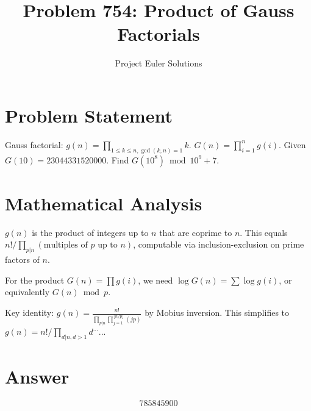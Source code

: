 \documentclass[11pt]{article}
\title{Problem 754: Product of Gauss Factorials}
\author{Project Euler Solutions}
\date{}
\begin{document}
\maketitle


\section{Problem Statement}
Gauss factorial: $g(n) = \prod_{{1\le k\le n, \gcd(k,n)=1}} k$. $G(n) = \prod_{{i=1}}^n g(i)$. Given $G(10)=23044331520000$. Find $G(10^8) \bmod 10^9+7$.

\section{Mathematical Analysis}
$g(n)$ is the product of integers up to $n$ that are coprime to $n$. This equals $n!/\prod_{{p|n}} (\text{multiples of } p \text{ up to } n)$, computable via inclusion-exclusion on prime factors of $n$.

For the product $G(n) = \prod g(i)$, we need $\log G(n) = \sum \log g(i)$, or equivalently $G(n) \bmod p$.

Key identity: $g(n) = \frac{n!}{\prod_{{p|n}} \prod_{{j=1}}^{{\lfloor n/p\rfloor}} (jp)}$ by Mobius inversion. This simplifies to $g(n) = n! / \prod_{{d|n, d>1}} d^{...}$...

\section{Answer}

\[
\boxed{785845900}
\]
\end{document}
